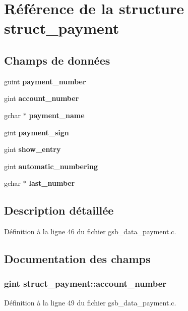 \section{Référence de la structure struct\_\-payment}
\label{structstruct__payment}
\subsection*{Champs de données}
\begin{DoxyCompactItemize}
\item 
guint {\bf payment\_\-number}
\item 
gint {\bf account\_\-number}
\item 
gchar $\ast$ {\bf payment\_\-name}
\item 
gint {\bf payment\_\-sign}
\item 
gint {\bf show\_\-entry}
\item 
gint {\bf automatic\_\-numbering}
\item 
gchar $\ast$ {\bf last\_\-number}
\end{DoxyCompactItemize}


\subsection{Description détaillée}


Définition à la ligne 46 du fichier gsb\_\-data\_\-payment.c.



\subsection{Documentation des champs}
\subsubsection[{account\_\-number}]{\setlength{\rightskip}{0pt plus 5cm}gint {\bf struct\_\-payment::account\_\-number}}\label{structstruct__payment_a9908f14dc19c59cf8cf07f0ca72770a8}


Définition à la ligne 49 du fichier gsb\_\-data\_\-payment.c.

